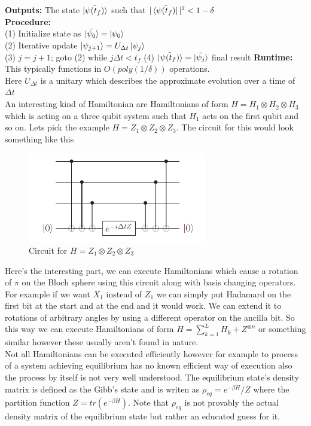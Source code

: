 \documentclass{report}
\begin{document}
\textbf{Outputs: } The state $\ket{\tilde{\psi(t_f)}}$ such that $|\bra{\tilde{\psi(t_f)}}|^2 < 1 - \delta$\\
\textbf{Procedure: }\\
\indent (1) Initialize state as $\ket{\tilde{\psi_0}} = \ket{\psi_0}$\\
\indent (2) Iterative update $\ket{\psi_{j+1}} = U_{\Delta{t}}\ket{\psi_{j}}$\\
\indent (3) $j = j+1$; goto (2) while $j\Delta{t} < t_f$
\indent (4) $\ket{\tilde{\psi(t_f)}} = \ket{\tilde{\psi_j}}$ final result
\textbf{Runtime: }This typically functions in $O(poly(1/\delta))$ operations.\\
Here $U_{\Delta{t}}$ is a unitary which describes the approximate evolution over a time of $\Delta{t}$\\ 
An interesting kind of Hamiltonian are Hamiltonians of form $H = {H_{1}}\otimes{H_{2}}\otimes{H_{3}}$ which is acting on a three qubit system such that $H_{1}$ acts on the first qubit and so on. Lets pick the example $H = {Z_{1}}\otimes{Z_{2}}\otimes{Z_{3}}$. The circuit for this would look something like this
\begin{figure}[ht]
    \centering
    \includegraphics[width = 0.7\textwidth]{images/hamiltonian stuff.png}
    \caption{Circuit for $H = {Z_{1}}\otimes{Z_{2}}\otimes{Z_{3}}$}
\end{figure}
Here's the interesting part, we can execute Hamiltonians which cause a rotation of $\pi$ on the Bloch sphere using this circuit along with basis changing operators. For example if we want $X_{1}$ instead of $Z_{1}$ we can simply put Hadamard on the first bit at the start and at the end and it would work. We can extend it to rotations of arbitrary angles by using a different operator on the ancilla bit. So this way we can execute Hamiltonians of form $H = \sum_{k = 1}^{L}H_{k} + Z^{\otimes{n}}$ or something similar however these usually aren't found in nature.\\
Not all Hamiltonians can be executed efficiently however for example to process of a system achieving equilibrium has no known efficient way of execution also the process by itself is not very well understood. The equilibrium state's density matrix is defined as the Gibb's state and is writen as $\rho_{eq} = e^{-\beta{H}}/Z$ where the partition function $Z = tr(e^{-\beta{H}})$. Note that $\rho_{eq}$ is not provably the actual density matrix of the equilibrium state but rather an educated guess for it.
\end{document}
